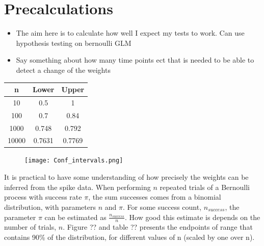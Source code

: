 \section{Precalculations}
\label{Precalc}

\begin{itemize}
    \item The aim here is to calculate how well I expect my tests to work. Can use hypothesis testing on bernoulli GLM 
    \item Say something about how many time points ect that is needed to be able to detect a change of the weights
\end{itemize}

\begin{table}
\begin{center}
 \begin{tabular}{||c c c ||} 
 \hline
 n & Lower & Upper \\ [0.5ex] 
 \hline\hline
 10 & 0.5 & 1 \\ 
 \hline
 100 & 0.7 & 0.84 \\
 \hline
 1000 & 0.748 & 0.792 \\
 \hline
 10000 & 0.7631 & 0.7769 \\ [1ex] 
 \hline
\end{tabular}
\end{center}
\end{table}

\begin{figure}[h]
    \centering
    \texttt{[image: Conf\_intervals.png]}
\end{figure}

It is practical to have some understanding of how precisely the weights can be inferred from the spike data. When performing $n$ repeated trials of a Bernoulli process with success rate $\pi$, the sum successes comes from a binomial distribution, with parameters $n$ and $\pi$. For some success count, $n_{success}$, the parameter $\pi$ can be estimated as $\frac{n_{success}}{n}$. How good this estimate is depends on the number of trials, $n$. Figure ?? and table ?? presents the endpoints of range that contains 90\% of the distribution, for different values of n (scaled by one over n). 